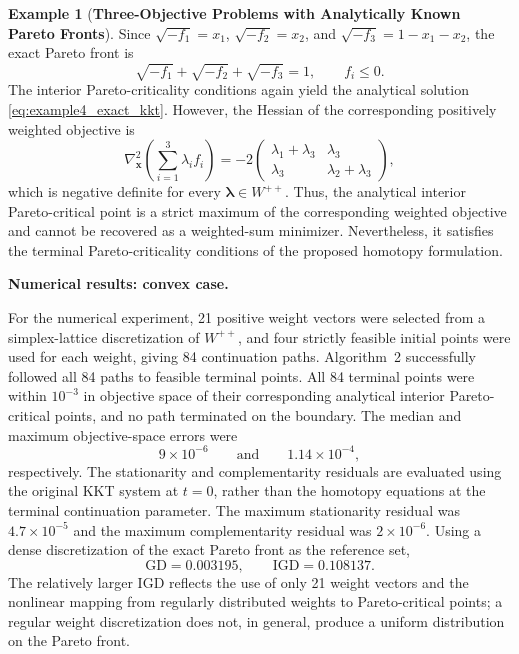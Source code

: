 \documentclass[11pt,pdflatex,sn-mathphys-ay]{sn-jnl}%
\theoremstyle{definition}
\theoremstyle{thmstyleone}%
\theoremstyle{thmstyletwo}%
\newtheorem{example}{Example}%
\theoremstyle{thmstylethree}%
\begin{document}
\begin{example}[\textbf{Three-Objective Problems with Analytically Known Pareto Fronts}]
		Since $\sqrt{-f_1}=x_1$, $\sqrt{-f_2}=x_2$, and
		$\sqrt{-f_3}=1-x_1-x_2$, the exact Pareto front is
		\begin{equation}
			\label{eq:example4_concave_pf}
			\sqrt{-f_1}+\sqrt{-f_2}+\sqrt{-f_3}=1,
			\qquad f_i\leq0.
		\end{equation}
		The interior Pareto-criticality conditions again yield the
		analytical solution \eqref{eq:example4_exact_kkt}. However,
		the Hessian of the corresponding positively weighted objective is
		\[
		\nabla_{\bm{x}}^2
		\left(\sum_{i=1}^3\lambda_i f_i\right)
		=
		-2\begin{pmatrix}
			\lambda_1+\lambda_3 & \lambda_3\\
			\lambda_3 & \lambda_2+\lambda_3
		\end{pmatrix},
		\]
		which is negative definite for every $\bm{\lambda}\in W^{++}$.
		Thus, the analytical interior Pareto-critical point is a strict
		maximum of the corresponding weighted objective and cannot be
		recovered as a weighted-sum minimizer. Nevertheless, it satisfies
		the terminal Pareto-criticality conditions of the proposed
		homotopy formulation.
		
		\medskip
		\noindent\textbf{Numerical results: convex case.}
		
		For the numerical experiment, 21 positive weight vectors were selected
		from a simplex-lattice discretization of $W^{++}$, and four strictly
		feasible initial points were used for each weight, giving 84
		continuation paths. Algorithm~2 successfully followed all 84 paths to
		feasible terminal points. All 84 terminal points were within $10^{-3}$
		in objective space of their corresponding analytical interior
		Pareto-critical points, and no path terminated on the boundary.
		The median and maximum objective-space errors were
		\[
		9\times10^{-6}
		\qquad\text{and}\qquad
		1.14\times10^{-4},
		\]
		respectively. The stationarity and complementarity
		residuals are evaluated using the original
		KKT system at $t=0$, rather than the
		homotopy equations at the terminal
		continuation parameter. The maximum stationarity residual was
		$4.7\times10^{-5}$ and the maximum complementarity residual was
		$2\times10^{-6}$. Using a dense discretization of the exact Pareto
		front as the reference set,
		\[
		\mathrm{GD}=0.003195,
		\qquad
		\mathrm{IGD}=0.108137.
		\]
		The relatively larger IGD reflects the use of only 21 weight vectors
		and the nonlinear mapping from regularly distributed weights to
		Pareto-critical points; a regular weight discretization does not, in
		general, produce a uniform distribution on the Pareto front.
		

\end{example}
\end{document}
